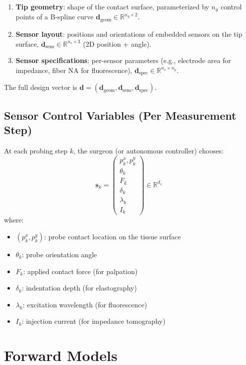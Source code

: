 \documentclass[11pt,a4paper]{article}
\newcommand{\R}{\mathbb{R}}
\theoremstyle{definition}
\begin{document}
\begin{enumerate}[nosep]
  \item \textbf{Tip geometry}: shape of the contact surface, parameterized by $n_g$ control points of a B-spline curve $\bm{d}_{\text{geom}} \in \R^{n_g \times 2}$.
  \item \textbf{Sensor layout}: positions and orientations of embedded sensors on the tip surface, $\bm{d}_{\text{sens}} \in \R^{n_s \times 3}$ (2D position + angle).
  \item \textbf{Sensor specifications}: per-sensor parameters (e.g., electrode area for impedance, fiber NA for fluorescence), $\bm{d}_{\text{spec}} \in \R^{n_s \times n_p}$.
\end{enumerate}

The full design vector is $\bm{d} = (\bm{d}_{\text{geom}}, \bm{d}_{\text{sens}}, \bm{d}_{\text{spec}})$.

\subsection{Sensor Control Variables (Per Measurement Step)}

At each probing step $k$, the surgeon (or autonomous controller) chooses:
\[
  \bm{s}_k = \begin{pmatrix} p_k^x, p_k^y \\ \theta_k \\ F_k \\ \delta_k \\ \lambda_k \\ I_k \end{pmatrix} \in \R^{d_s}
\]
where:
\begin{itemize}[nosep]
  \item $(p_k^x, p_k^y)$: probe contact location on the tissue surface
  \item $\theta_k$: probe orientation angle
  \item $F_k$: applied contact force (for palpation)
  \item $\delta_k$: indentation depth (for elastography)
  \item $\lambda_k$: excitation wavelength (for fluorescence)
  \item $I_k$: injection current (for impedance tomography)
\end{itemize}

\section{Forward Models}
\end{document}
